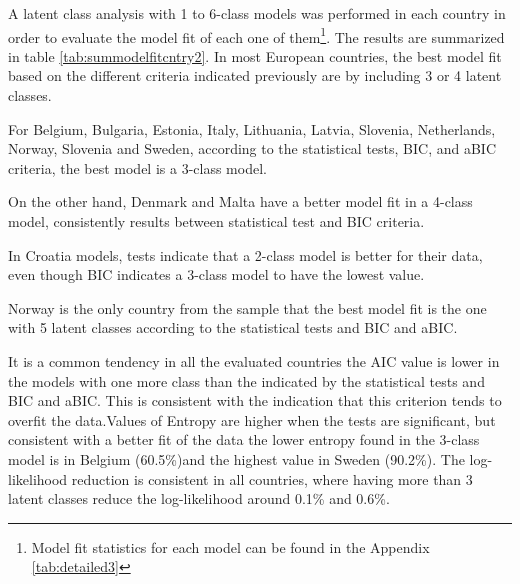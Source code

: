 \documentclass[12pt,a4paper,oneside]{reedthesis}
\begin{document}
A latent class analysis with 1 to 6-class models was performed in each country in order to evaluate the model fit of each one of them\footnote{Model fit statistics for each model can be found in the Appendix \ref{tab:detailed3}}. The results are summarized in table \ref{tab:summodelfitcntry2}. In most European countries, the best model fit based on the different criteria indicated previously are by including 3 or 4 latent classes.

For Belgium, Bulgaria, Estonia, Italy, Lithuania, Latvia, Slovenia, Netherlands, Norway, Slovenia and Sweden, according to the statistical tests, BIC, and aBIC criteria, the best model is a 3-class model.

On the other hand, Denmark and Malta have a better model fit in a 4-class model, consistently results between statistical test and BIC criteria.

In Croatia models, tests indicate that a 2-class model is better for their data, even though BIC indicates a 3-class model to have the lowest value.

Norway is the only country from the sample that the best model fit is the one with 5 latent classes according to the statistical tests and BIC and aBIC.

It is a common tendency in all the evaluated countries the AIC value is lower in the models with one more class than the indicated by the statistical tests and BIC and aBIC. This is consistent with the indication that this criterion tends to overfit the data.Values of Entropy are higher when the tests are significant, but consistent with a better fit of the data the lower entropy found in the 3-class model is in Belgium (60.5\%)and the highest value in Sweden (90.2\%). The log-likelihood reduction is consistent in all countries, where having more than 3 latent classes reduce the log-likelihood around 0.1\% and 0.6\%.
\end{document}
